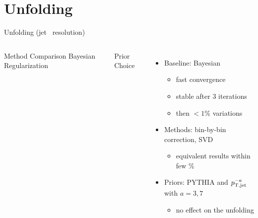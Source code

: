 \documentclass[xcolor={usenames,dvipsnames}]{beamer}
\begin{document}
\section{Unfolding}

\begin{frame}{Unfolding (jet \pt\ resolution)}
\begin{columns}
\begin{center}
\tiny
Method Comparison
Bayesian Regularization
\end{center}
\begin{center}
\tiny
Prior Choice \\
\end{center}
\vspace{-20pt}
\begin{itemize}
\scriptsize
\item Baseline: Bayesian
\begin{itemize}
\tiny
\item fast convergence
\item stable after 3 iterations
\item then $< 1$\% variations
\end{itemize}
\item Methods: bin-by-bin correction, SVD
\begin{itemize}
\tiny
\item equivalent results within few \%
\end{itemize}
\item Priors: PYTHIA and $p_{\mathrm{T,jet}}^{-a}$ with $a=3, 7$
\begin{itemize}
\tiny
\item no effect on the unfolding
\end{itemize}
\end{itemize}
\end{columns}
\end{frame}
\end{document}

